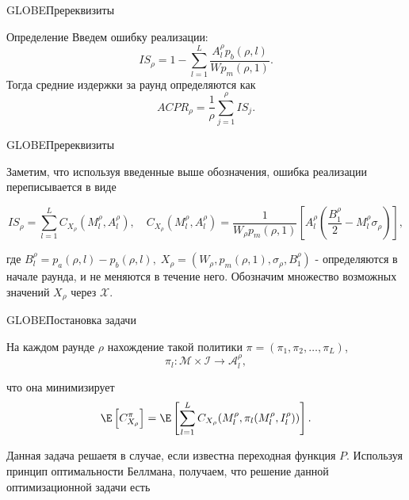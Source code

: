 \documentclass[aspectratio=169]{beamer}
\begin{document}
        \begin{frame}{GLOBE}{Пререквизиты}
            \begin{block}{Определение}
            Введем ошибку реализации:
                \begin{equation*}
                    IS_\rho = 1 - \sum\limits_{l = 1}^{L} \frac{A_l^\rho p_b(\rho, l)}{Wp_m(\rho , 1)}.
                \end{equation*}
                Тогда средние издержки за раунд определяются как
                \begin{equation*}
                    ACPR_\rho = \frac{1}{\rho} \sum\limits_{j=1}^\rho IS_j.
                \end{equation*}
            \end{block}

        \end{frame}

        \begin{frame}{GLOBE}{Пререквизиты}

            Заметим, что используя введенные выше обозначения, ошибка реализации переписывается в виде
            
            \begin{equation*}
                IS_\rho = \sum\limits_{l=1}^L C_{X_\rho}(M_l^\rho, A_l^\rho), \quad C_{X_\rho}(M_l^\rho, A_l^\rho) = \frac{1}{W_\rho p_m(\rho, 1)} \left[ A_l^\rho \left(\frac{B_1^\rho}{2} - M_l^\rho \sigma_\rho \right) \right],
            \end{equation*}
            
            где $B_l^\rho = p_a(\rho, l) - p_b(\rho, l), \; X_\rho = (W_\rho, p_m(\rho, 1), \sigma_\rho, B_1^\rho )$ - определяются в начале раунда, и не меняются в течение него. Обозначим множество возможных значений $X_\rho$ через $\mathcal X$.
        
        \end{frame}

        \begin{frame}{GLOBE}{Постановка задачи}
        
            На каждом раунде $\rho$ нахождение такой политики $\pi = (\pi_1, \pi_2, \ldots, \pi_L)$,
            \begin{equation*}
                \pi_l \colon \mathcal M \times \mathcal I \to \mathcal A_l^\rho ,
            \end{equation*}

            что она минимизирует
            \begin{equation*}
                \E \left[ C_{X_\rho}^\pi \right] = \E \left[ \sum\limits_{l=1}^L C_{X_\rho}(M_l^\rho, \pi_l (M_l^\rho, I_l^\rho) ) \right].
            \end{equation*}

            Данная задача решаетя в случае, если известна переходная функция $P$. Используя принцип оптимальности Беллмана, получаем, что решение данной оптимизационной задачи есть
            
            
        \end{frame}
        
\end{document}
